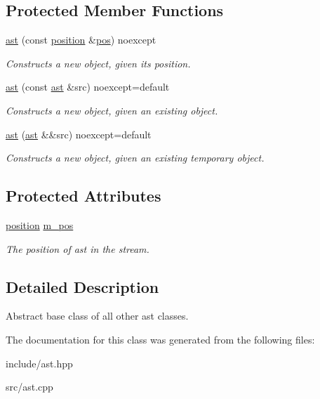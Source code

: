 \subsection*{Protected Member Functions}
\begin{DoxyCompactItemize}
\item 
\hypertarget{classbfjit_1_1ast_a6b8483df6623f32b184f6cf43fb6bcc1}{}\label{classbfjit_1_1ast_a6b8483df6623f32b184f6cf43fb6bcc1} 
\hyperlink{classbfjit_1_1ast_a6b8483df6623f32b184f6cf43fb6bcc1}{ast} (const \hyperlink{classbfjit_1_1position}{position} \&\hyperlink{classbfjit_1_1ast_a748b75683a33e11ad87b907ba0118c3d}{pos}) noexcept
\begin{DoxyCompactList}\small\item\em Constructs a new object, given its position. \end{DoxyCompactList}\item 
\hypertarget{classbfjit_1_1ast_aac08f2c318e8ccce75bd5028b48eaa91}{}\label{classbfjit_1_1ast_aac08f2c318e8ccce75bd5028b48eaa91} 
\hyperlink{classbfjit_1_1ast_aac08f2c318e8ccce75bd5028b48eaa91}{ast} (const \hyperlink{classbfjit_1_1ast}{ast} \&src) noexcept=default
\begin{DoxyCompactList}\small\item\em Constructs a new object, given an existing object. \end{DoxyCompactList}\item 
\hypertarget{classbfjit_1_1ast_a256a788db24653878f8e935945ddf0ed}{}\label{classbfjit_1_1ast_a256a788db24653878f8e935945ddf0ed} 
\hyperlink{classbfjit_1_1ast_a256a788db24653878f8e935945ddf0ed}{ast} (\hyperlink{classbfjit_1_1ast}{ast} \&\&src) noexcept=default
\begin{DoxyCompactList}\small\item\em Constructs a new object, given an existing temporary object. \end{DoxyCompactList}\end{DoxyCompactItemize}
\subsection*{Protected Attributes}
\begin{DoxyCompactItemize}
\item 
\hypertarget{classbfjit_1_1ast_a376d0d491063ec18be68d2e22b361d89}{}\label{classbfjit_1_1ast_a376d0d491063ec18be68d2e22b361d89} 
\hyperlink{classbfjit_1_1position}{position} \hyperlink{classbfjit_1_1ast_a376d0d491063ec18be68d2e22b361d89}{m\+\_\+pos}
\begin{DoxyCompactList}\small\item\em The position of ast in the stream. \end{DoxyCompactList}\end{DoxyCompactItemize}


\subsection{Detailed Description}
Abstract base class of all other ast classes. 

The documentation for this class was generated from the following files\+:\begin{DoxyCompactItemize}
\item 
include/ast.\+hpp\item 
src/ast.\+cpp\end{DoxyCompactItemize}
